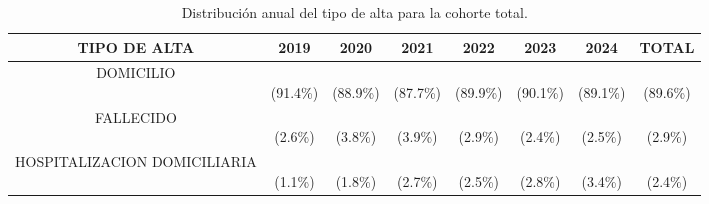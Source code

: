 \begin{table}[htbp]
\centering
\scriptsize
\setlength{\tabcolsep}{4pt}
\renewcommand{\arraystretch}{1.4}
\caption{Distribución anual del tipo de alta para la cohorte total.}
\label{tab:frecuencia_tipo_alta_total}
\begin{tabular}{|c|c|c|c|c|c|c|c|}
\hline
\parbox[t]{4.0cm}{\centering\textbf{TIPO DE ALTA}} & 
\parbox[t]{1.2cm}{\centering\textbf{2019}} & 
\parbox[t]{1.2cm}{\centering\textbf{2020}} & 
\parbox[t]{1.2cm}{\centering\textbf{2021}} & 
\parbox[t]{1.2cm}{\centering\textbf{2022}} & 
\parbox[t]{1.2cm}{\centering\textbf{2023}} & 
\parbox[t]{1.2cm}{\centering\textbf{2024}} & 
\parbox[t]{1.6cm}{\centering\textbf{TOTAL}} \\ \hline
\parbox[t]{4.0cm}{\raggedright DOMICILIO} & \parbox[t]{1.2cm}{\\(91.4\%)} & \parbox[t]{1.2cm}{\\(88.9\%)} & \parbox[t]{1.2cm}{\\(87.7\%)} & \parbox[t]{1.2cm}{\\(89.9\%)} & \parbox[t]{1.2cm}{\\(90.1\%)} & \parbox[t]{1.2cm}{\\(89.1\%)} & \parbox[t]{1.6cm}{\\(89.6\%)} \\ \hline
\parbox[t]{4.0cm}{\raggedright FALLECIDO} & \parbox[t]{1.2cm}{\\(2.6\%)} & \parbox[t]{1.2cm}{\\(3.8\%)} & \parbox[t]{1.2cm}{\\(3.9\%)} & \parbox[t]{1.2cm}{\\(2.9\%)} & \parbox[t]{1.2cm}{\\(2.4\%)} & \parbox[t]{1.2cm}{\\(2.5\%)} & \parbox[t]{1.6cm}{\\(2.9\%)} \\ \hline
\parbox[t]{4.0cm}{\raggedright HOSPITALIZACION DOMICILIARIA} & \parbox[t]{1.2cm}{\\(1.1\%)} & \parbox[t]{1.2cm}{\\(1.8\%)} & \parbox[t]{1.2cm}{\\(2.7\%)} & \parbox[t]{1.2cm}{\\(2.5\%)} & \parbox[t]{1.2cm}{\\(2.8\%)} & \parbox[t]{1.2cm}{\\(3.4\%)} & \parbox[t]{1.6cm}{\\(2.4\%)} \\ \hline

\end{tabular}
\end{table}
